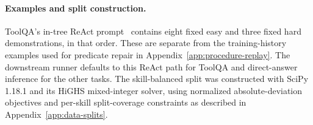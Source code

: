 \paragraph{Examples and split construction.}
ToolQA's in-tree ReAct prompt~\citep{yao2023react} contains eight fixed easy and three fixed hard demonstrations, in that order. These are separate from the training-history examples used for predicate repair in Appendix~\ref{app:procedure-replay}. The downstream runner defaults to this ReAct path for ToolQA and direct-answer inference for the other tasks. The skill-balanced split was constructed with SciPy 1.18.1 and its HiGHS mixed-integer solver, using normalized absolute-deviation objectives and per-skill split-coverage constraints as described in Appendix~\ref{app:data-splits}.
